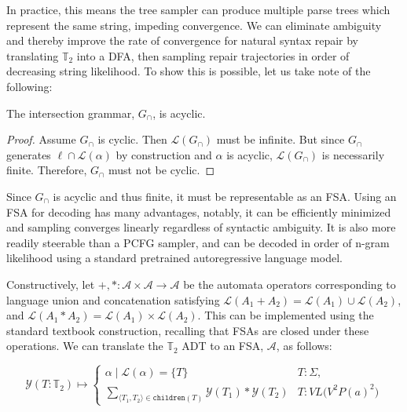 \documentclass[runningheads]{llncs}
\begin{document}
In practice, this means the tree sampler can produce multiple parse trees which represent the same string, impeding convergence. We can eliminate ambiguity and thereby improve the rate of convergence for natural syntax repair by translating $\mathbb{T}_2$ into a DFA, then sampling repair trajectories in order of decreasing string likelihood. To show this is possible, let us take note of the following:

  \begin{lemma}\label{lemma:acyc_gram}
    The intersection grammar, $G_\cap$, is acyclic.
  \end{lemma}

  \begin{proof}
    Assume $G_\cap$ is cyclic. Then $\mathcal{L}(G_\cap)$ must be infinite. But since $G_\cap$ generates $\ell \cap \mathcal{L}(\alpha)$ by construction and $\alpha$ is acyclic, $\mathcal{L}(G_\cap)$ is necessarily finite. Therefore, $G_\cap$ must not be cyclic.
  \end{proof}

  Since $G_\cap$ is acyclic and thus finite, it must be representable as an FSA. Using an FSA for decoding has many advantages, notably, it can be efficiently minimized and sampling converges linearly regardless of syntactic ambiguity. It is also more readily steerable than a PCFG sampler, and can be decoded in order of n-gram likelihood using a standard pretrained autoregressive language model.

Constructively, let $+, *: \mathcal{A}\times \mathcal{A} \rightarrow \mathcal{A}$ be the automata operators corresponding to language union and concatenation satisfying $\mathcal{L}(A_1 + A_2) = \mathcal{L}(A_1)\cup\mathcal{L}(A_2)$, and $\mathcal{L}(A_1 * A_2) = \mathcal{L}(A_1)\times\mathcal{L}(A_2)$. This can be implemented using the standard textbook construction, recalling that FSAs are closed under these operations. We can translate the $\mathbb{T}_2$ ADT to an FSA, $\mathcal{A}$, as follows:

\begin{equation}
\mathcal{Y}(T:\mathbb{T}_2) \mapsto \begin{cases}
\alpha \mid \mathcal{L}(\alpha) = \{T\} & T: \Sigma, \\
\sum_{\langle T_1, T_2\rangle \in \texttt{children}(T)} \mathcal{Y}(T_1)*\mathcal{Y}(T_2) & T: VL\big(V^2P(a)^2\big)
\end{cases}
\end{equation}
\end{document}
